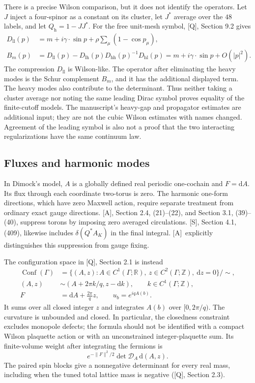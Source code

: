 \documentclass[11pt]{article}
\numberwithin{equation}{section}
\newcommand{\R}{\mathbb R}
\newcommand{\Z}{\mathbb Z}
\newcommand{\dd}{\mathrm d}
\newcommand{\Q}{\textup{[Q]}}
\newcommand{\AG}{\textup{[A]}}
\newcommand{\US}{\textup{[S]}}
\begin{document}
There is a precise Wilson comparison, but it does not identify the
operators. Let $J$ inject a four-spinor as a constant on its cluster,
let $J^*$ average over the $48$ labels, and let $Q_{\mathrm h}=1-JJ^*$.
For the free unit-mesh symbol, \Q, Section 9.2 gives
\begin{align}
 D_{\mathrm{ll}}(p)&=m+i\gamma\cdot\sin p+
                         \rho\sum_\mu(1-\cos p_\mu),\\
 B_m(p)&=D_{\mathrm{ll}}(p)
         -D_{\mathrm{lh}}(p)D_{\mathrm{hh}}(p)^{-1}D_{\mathrm{hl}}(p)
       =m+i\gamma\cdot\sin p+O(|p|^2).
 \label{eq:digest-Schur}
\end{align}
The compression $D_{\mathrm{ll}}$ is Wilson-like. The operator after
eliminating the heavy modes is the Schur complement $B_m$, and it
has the additional displayed term. The heavy modes also contribute
to the determinant. Thus neither taking a cluster average nor noting
the same leading Dirac symbol proves equality of the finite-cutoff
models. The manuscript's heavy-gap and propagator estimates are
additional input; they are not the cubic Wilson estimates with names
changed. Agreement of the leading symbol is also not a proof that
the two interacting regularizations have the same continuum law.

\subsection{Fluxes and harmonic modes}

In Dimock's model, $A$ is a globally defined real periodic one-cochain
and $F=\dd A$. Its flux through each coordinate two-torus is zero.
The harmonic one-form directions, which have zero Maxwell action,
require separate treatment from ordinary exact gauge directions.
\AG, Section 2.4, (21)--(22), and Section 3.1, (39)--(40), suppress
torons by imposing zero averaged circulations. \US, Section 4.1,
(409), likewise includes $\delta(Q^*A_K)$ in the final integral.
\AG\ explicitly distinguishes this suppression from gauge fixing.

The configuration space in \Q, Section 2.1 is instead
\begin{align}
 \operatorname{Conf}(\Gamma)
 &=\{(A,z):A\in C^1(\Gamma;\R),\ z\in C^2(\Gamma;\Z),\ \dd z=0\}/\sim,
 \\
 (A,z)&\sim(A+2\pi k/q,z-\dd k),\qquad k\in C^1(\Gamma;\Z),\\
 F&=\dd A+\frac{2\pi}{q}z,\qquad u_b=e^{iqA(b)}.
 \label{eq:digest-flux-model}
\end{align}
It sums over all closed integer $z$ and integrates $A(b)$ over
$[0,2\pi/q)$. The curvature is unbounded and closed. In particular,
the closedness constraint excludes monopole defects; the formula
should not be identified with a compact Wilson plaquette action or
with an unconstrained integer-plaquette sum.
Its finite-volume weight after integrating the fermions is
\begin{equation}
 e^{-\|F\|^2/2}\det\mathcal D_A\,\dd(A,z).
\end{equation}
The paired spin blocks give a nonnegative determinant for every real
mass, including when the tuned total lattice mass is negative
(\Q, Section 2.3).
\end{document}
